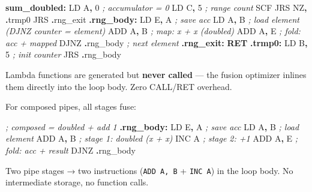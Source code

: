 \documentclass[
  11pt,
]{article}
\newenvironment{Shaded}{\begin{snugshade}}{\end{snugshade}}
\newcommand{\BuiltInTok}[1]{#1}
\newcommand{\CommentTok}[1]{\textcolor[rgb]{0.56,0.35,0.01}{\textit{#1}}}
\newcommand{\ControlFlowTok}[1]{\textcolor[rgb]{0.13,0.29,0.53}{\textbf{#1}}}
\newcommand{\DecValTok}[1]{\textcolor[rgb]{0.00,0.00,0.81}{#1}}
\newcommand{\FunctionTok}[1]{\textcolor[rgb]{0.13,0.29,0.53}{\textbf{#1}}}
\newcommand{\NormalTok}[1]{#1}
\newcommand{\OperatorTok}[1]{\textcolor[rgb]{0.81,0.36,0.00}{\textbf{#1}}}
\begin{document}
\begin{Shaded}
\begin{Highlighting}[]
\FunctionTok{sum\_doubled:}
\NormalTok{    LD A}\OperatorTok{,} \DecValTok{0}              \CommentTok{; accumulator = 0}
\NormalTok{    LD C}\OperatorTok{,} \DecValTok{5}              \CommentTok{; range count}
\NormalTok{    SCF}
\NormalTok{    JRS NZ}\OperatorTok{,} \OperatorTok{.}\NormalTok{trmp0}
\NormalTok{    JRS }\OperatorTok{.}\NormalTok{rng\_exit}
\FunctionTok{.rng\_body:}
\NormalTok{    LD E}\OperatorTok{,}\NormalTok{ A              }\CommentTok{; save acc}
\NormalTok{    LD A}\OperatorTok{,}\NormalTok{ B              }\CommentTok{; load element (DJNZ counter = element)}
    \BuiltInTok{ADD}\NormalTok{ A}\OperatorTok{,}\NormalTok{ B             }\CommentTok{; map: x + x (doubled)}
    \BuiltInTok{ADD}\NormalTok{ A}\OperatorTok{,}\NormalTok{ E             }\CommentTok{; fold: acc + mapped}
\NormalTok{    DJNZ }\OperatorTok{.}\NormalTok{rng\_body       }\CommentTok{; next element}
\FunctionTok{.rng\_exit:}
    \ControlFlowTok{RET}
\FunctionTok{.trmp0:}
\NormalTok{    LD B}\OperatorTok{,} \DecValTok{5}              \CommentTok{; init counter}
\NormalTok{    JRS }\OperatorTok{.}\NormalTok{rng\_body}
\end{Highlighting}
\end{Shaded}

Lambda functions are generated but \textbf{never called} --- the fusion
optimizer inlines them directly into the loop body. Zero CALL/RET
overhead.

For composed pipes, all stages fuse:

\begin{Shaded}
\begin{Highlighting}[]
\CommentTok{; composed = doubled + add 1}
\FunctionTok{.rng\_body:}
\NormalTok{    LD E}\OperatorTok{,}\NormalTok{ A              }\CommentTok{; save acc}
\NormalTok{    LD A}\OperatorTok{,}\NormalTok{ B              }\CommentTok{; load element}
    \BuiltInTok{ADD}\NormalTok{ A}\OperatorTok{,}\NormalTok{ B             }\CommentTok{; stage 1: doubled (x + x)}
    \BuiltInTok{INC}\NormalTok{ A                }\CommentTok{; stage 2: +1}
    \BuiltInTok{ADD}\NormalTok{ A}\OperatorTok{,}\NormalTok{ E             }\CommentTok{; fold: acc + result}
\NormalTok{    DJNZ }\OperatorTok{.}\NormalTok{rng\_body}
\end{Highlighting}
\end{Shaded}

Two pipe stages → two instructions (\texttt{ADD\ A,\ B} +
\texttt{INC\ A}) in the loop body. No intermediate storage, no function
calls.
\end{document}
